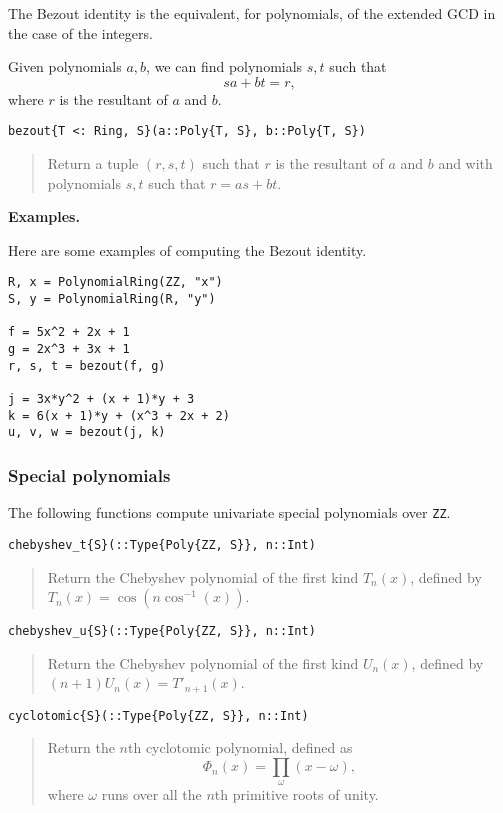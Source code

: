 \documentclass[a4paper,10pt]{article}
\newcommand{\code}{\lstinline}
\newcommand{\desc}[1]{\vspace{-3mm}\begin{quote}#1\end{quote}}
\begin{document}
{{The Bezout identity is the equivalent, for polynomials, of the extended GCD
in the case of the integers.

Given polynomials $a, b$, we can find polynomials $s, t$ such that
$$sa + bt = r,$$
where $r$ is the resultant of $a$ and $b$.

\begin{lstlisting}
bezout{T <: Ring, S}(a::Poly{T, S}, b::Poly{T, S})
\end{lstlisting}

\desc{Return a tuple $(r, s, t)$ such that $r$ is the resultant of $a$ and $b$
and with polynomials $s, t$ such that $r = as + bt$.}

\textbf{Examples.}

Here are some examples of computing the Bezout identity.

\begin{lstlisting}
R, x = PolynomialRing(ZZ, "x")
S, y = PolynomialRing(R, "y")

f = 5x^2 + 2x + 1
g = 2x^3 + 3x + 1
r, s, t = bezout(f, g)

j = 3x*y^2 + (x + 1)*y + 3
k = 6(x + 1)*y + (x^3 + 2x + 2)
u, v, w = bezout(j, k)
\end{lstlisting}

\subsubsection{Special polynomials}

The following functions compute univariate special polynomials over \code{ZZ}.

\begin{lstlisting}
chebyshev_t{S}(::Type{Poly{ZZ, S}}, n::Int)
\end{lstlisting}

\desc{Return the Chebyshev polynomial of the first kind $T_n(x)$, defined by 
$T_n(x) = \cos(n \cos^{-1}(x))$.}

\begin{lstlisting}
chebyshev_u{S}(::Type{Poly{ZZ, S}}, n::Int)
\end{lstlisting}

\desc{Return the Chebyshev polynomial of the first kind $U_n(x)$, defined by 
$(n+1) U_n(x) = T'_{n+1}(x)$.}

\begin{lstlisting}
cyclotomic{S}(::Type{Poly{ZZ, S}}, n::Int)
\end{lstlisting}

\desc{Return the $n$th cyclotomic polynomial, defined as
$$\Phi_n(x) = \prod_{\omega} (x-\omega),$$ where $\omega$ runs over all the 
$n$th primitive roots of unity.}

}}
\end{document}
